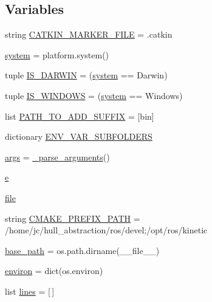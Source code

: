 \subsection*{Variables}
\begin{DoxyCompactItemize}
\item 
string \hyperlink{namespace__setup__util_a3fa0ca5a460a71a43cbc3d4954ab1f10}{C\+A\+T\+K\+I\+N\+\_\+\+M\+A\+R\+K\+E\+R\+\_\+\+F\+I\+LE} = \textquotesingle{}.catkin\textquotesingle{}
\item 
\hyperlink{namespace__setup__util_ae9fca6a80a6923f4580be72f68fee325}{system} = platform.\+system()
\item 
tuple \hyperlink{namespace__setup__util_aecbb100ce6f94bb3c7e16d58fde05f96}{I\+S\+\_\+\+D\+A\+R\+W\+IN} = (\hyperlink{namespace__setup__util_ae9fca6a80a6923f4580be72f68fee325}{system} == \textquotesingle{}Darwin\textquotesingle{})
\item 
tuple \hyperlink{namespace__setup__util_a6fe69c2dbd92959b6651a28cbb846e6e}{I\+S\+\_\+\+W\+I\+N\+D\+O\+WS} = (\hyperlink{namespace__setup__util_ae9fca6a80a6923f4580be72f68fee325}{system} == \textquotesingle{}Windows\textquotesingle{})
\item 
list \hyperlink{namespace__setup__util_a7de27b8c021c888c6288a885f1e9afa9}{P\+A\+T\+H\+\_\+\+T\+O\+\_\+\+A\+D\+D\+\_\+\+S\+U\+F\+F\+IX} = \mbox{[}\textquotesingle{}bin\textquotesingle{}\mbox{]}
\item 
dictionary \hyperlink{namespace__setup__util_aa31804f1be8660156ce9394b33c68dc4}{E\+N\+V\+\_\+\+V\+A\+R\+\_\+\+S\+U\+B\+F\+O\+L\+D\+E\+RS}
\item 
\hyperlink{namespace__setup__util_a547963d07c6371df1c51b1384a2dec28}{args} = \hyperlink{namespace__setup__util_a57d9ecb280810c9a5409d44aeb9d0a25}{\+\_\+parse\+\_\+arguments}()
\item 
\hyperlink{namespace__setup__util_acdce690b925de33d6249bbbfa1109d61}{e}
\item 
\hyperlink{namespace__setup__util_aea63a1b32cc79bc3d872ab7cb30dd07e}{file}
\item 
string \hyperlink{namespace__setup__util_a2a6756158bb4094ed7d259eb564d0578}{C\+M\+A\+K\+E\+\_\+\+P\+R\+E\+F\+I\+X\+\_\+\+P\+A\+TH} = \textquotesingle{}/home/jc/hull\+\_\+abstraction/ros/devel;/opt/ros/kinetic\textquotesingle{}
\item 
\hyperlink{namespace__setup__util_a83d25140acd7788bbcb95843fe38e639}{base\+\_\+path} = os.\+path.\+dirname(\+\_\+\+\_\+file\+\_\+\+\_\+)
\item 
\hyperlink{namespace__setup__util_a9a935bdd9ee1aa0327161025bb18c136}{environ} = dict(os.\+environ)
\item 
list \hyperlink{namespace__setup__util_a8618d8be5f729d4c9696daa5e083a001}{lines} = \mbox{[}$\,$\mbox{]}
\end{DoxyCompactItemize}


